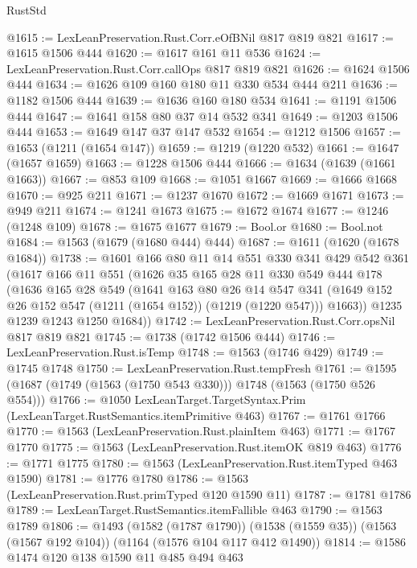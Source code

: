 \begin{lexlean}{RustStd}
\begin{coremodule}
{\begin{coremodule}
{{{{{{{{@1615 := LexLeanPreservation.Rust.Corr.eOfBNil @817 @819 @821
@1617 := @1615 @1506 @444
@1620 := @1617 @161 @11 @536
@1624 := LexLeanPreservation.Rust.Corr.callOps @817 @819 @821
@1626 := @1624 @1506 @444
@1634 := @1626 @109 @160 @180 @11 @330 @534 @444 @211
@1636 := @1182 @1506 @444
@1639 := @1636 @160 @180 @534
@1641 := @1191 @1506 @444
@1647 := @1641 @158 @80 @37 @14 @532 @341
@1649 := @1203 @1506 @444
@1653 := @1649 @147 @37 @147 @532
@1654 := @1212 @1506
@1657 := @1653 (@1211 (@1654 @147))
@1659 := @1219 (@1220 @532)
@1661 := @1647 (@1657 @1659)
@1663 := @1228 @1506 @444
@1666 := @1634 (@1639 (@1661 @1663))
@1667 := @853 @109
@1668 := @1051 @1667
@1669 := @1666 @1668
@1670 := @925 @211
@1671 := @1237 @1670
@1672 := @1669 @1671
@1673 := @949 @211
@1674 := @1241 @1673
@1675 := @1672 @1674
@1677 := @1246 (@1248 @109)
@1678 := @1675 @1677
@1679 := Bool.or
@1680 := Bool.not
@1684 := @1563 (@1679 (@1680 @444) @444)
@1687 := @1611 (@1620 (@1678 @1684))
@1738 := @1601
    @166
    @80
    @11
    @14
    @551
    @330
    @341
    @429
    @542
    @361
    (@1617
      @166
      @11
      @551
      (@1626
        @35
        @165
        @28
        @11
        @330
        @549
        @444
        @178
        (@1636
          @165
          @28
          @549
          (@1641
            @163
            @80
            @26
            @14
            @547
            @341
            (@1649 @152 @26 @152 @547 (@1211 (@1654 @152)) (@1219 (@1220 @547)))
            @1663))
        @1235
        @1239
        @1243
        @1250
        @1684))
@1742 := LexLeanPreservation.Rust.Corr.opsNil @817 @819 @821
@1745 := @1738 (@1742 @1506 @444)
@1746 := LexLeanPreservation.Rust.isTemp
@1748 := @1563 (@1746 @429)
@1749 := @1745 @1748
@1750 := LexLeanPreservation.Rust.tempFresh
@1761 := @1595 (@1687 (@1749 (@1563 (@1750 @543 @330))) @1748 (@1563 (@1750 @526 @554)))
@1766 := @1050 LexLeanTarget.TargetSyntax.Prim (LexLeanTarget.RustSemantics.itemPrimitive @463)
@1767 := @1761 @1766
@1770 := @1563 (LexLeanPreservation.Rust.plainItem @463)
@1771 := @1767 @1770
@1775 := @1563 (LexLeanPreservation.Rust.itemOK @819 @463)
@1776 := @1771 @1775
@1780 := @1563 (LexLeanPreservation.Rust.itemTyped @463 @1590)
@1781 := @1776 @1780
@1786 := @1563 (LexLeanPreservation.Rust.primTyped @120 @1590 @11)
@1787 := @1781 @1786
@1789 := LexLeanTarget.RustSemantics.itemFallible @463
@1790 := @1563 @1789
@1806 := @1493
    (@1582 (@1787 @1790))
    (@1538 (@1559 @35))
    (@1563 (@1567 @192 @104))
    (@1164 (@1576 @104 @117 @412 @1490))
@1814 := @1586 @1474 @120 @138 @1590 @11 @485 @494 @463
}}}}}}}}
\end{coremodule}}
\end{coremodule}
\end{lexlean}
